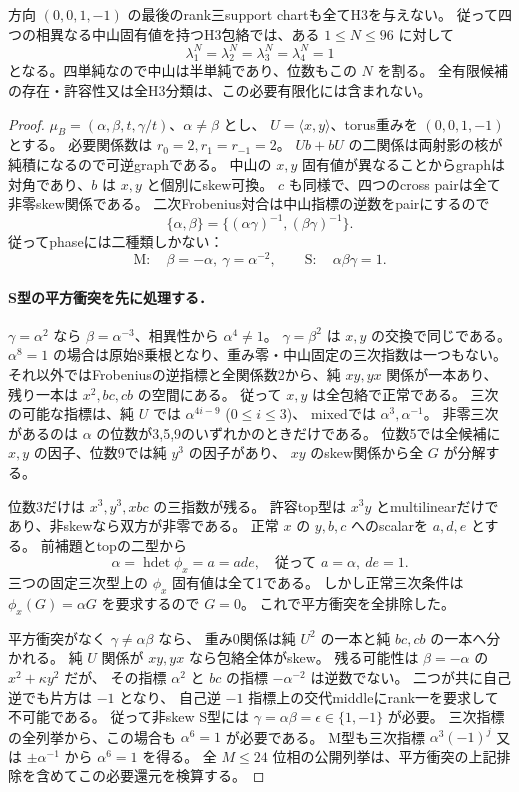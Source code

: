 \begin{theorem}[全rank三supportの排除]
\label{thm:cubic-all-four-simple-rank3-empty}
方向 $(0,0,1,-1)$ の最後のrank三support chartも全てH3を与えない。
従って四つの相異なる中山固有値を持つH3包絡では、ある $1\le N\le96$ に対して
\[
 \lambda_1^N=\lambda_2^N=\lambda_3^N=\lambda_4^N=1
\]
となる。四単純なので中山は半単純であり、位数もこの $N$ を割る。
全有限候補の存在・許容性又は全H3分類は、この必要有限化には含まれない。
\end{theorem}
\begin{proof}
$\mu_B=(\alpha,\beta,t,\gamma/t)$、$\alpha\ne\beta$ とし、
$U=\langle x,y\rangle$、torus重みを $(0,0,1,-1)$ とする。
必要関係数は $r_0=2,r_1=r_{-1}=2$。
$Ub+bU$ の二関係は両射影の核が純積になるので可逆graphである。
中山の $x,y$ 固有値が異なることからgraphは対角であり、$b$ は $x,y$ と個別にskew可換。
$c$ も同様で、四つのcross pairは全て非零skew関係である。
二次Frobenius対合は中山指標の逆数をpairにするので
\[
 \{\alpha,\beta\}=
 \{(\alpha\gamma)^{-1},(\beta\gamma)^{-1}\}.
\]
従ってphaseには二種類しかない：
\[
 \mathrm M:\quad \beta=-\alpha,\ \gamma=\alpha^{-2},
 \qquad
 \mathrm S:\quad \alpha\beta\gamma=1.
\]

\paragraph{S型の平方衝突を先に処理する．}
$\gamma=\alpha^2$ なら $\beta=\alpha^{-3}$、相異性から $\alpha^4\ne1$。
$\gamma=\beta^2$ は $x,y$ の交換で同じである。
$\alpha^8=1$ の場合は原始8乗根となり、重み零・中山固定の三次指数は一つもない。
それ以外ではFrobeniusの逆指標と全関係数2から、純 $xy,yx$ 関係が一本あり、
残り一本は $x^2,bc,cb$ の空間にある。
従って $x,y$ は全包絡で正常である。
三次の可能な指標は、純 $U$ では $\alpha^{4i-9}$ ($0\le i\le3$)、
mixedでは $\alpha^3,\alpha^{-1}$。
非零三次があるのは $\alpha$ の位数が3,5,9のいずれかのときだけである。
位数5では全候補に $x,y$ の因子、位数9では純 $y^3$ の因子があり、
$xy$ のskew関係から全 $G$ が分解する。

位数3だけは $x^3,y^3,xbc$ の三指数が残る。
許容top型は $x^3y$ とmultilinearだけであり、非skewなら双方が非零である。
正常 $x$ の $y,b,c$ へのscalarを $a,d,e$ とする。
前補題とtopの二型から
\[
 \alpha=\operatorname{hdet}\phi_x=a=ade,
 \quad\text{従って }a=\alpha,\ de=1.
\]
三つの固定三次型上の $\phi_x$ 固有値は全て1である。
しかし正常三次条件は $\phi_x(G)=\alpha G$ を要求するので $G=0$。
これで平方衝突を全排除した。

平方衝突がなく $\gamma\ne\alpha\beta$ なら、
重み0関係は純 $U^2$ の一本と純 $bc,cb$ の一本へ分かれる。
純 $U$ 関係が $xy,yx$ なら包絡全体がskew。
残る可能性は $\beta=-\alpha$ の $x^2+\kappa y^2$ だが、
その指標 $\alpha^2$ と $bc$ の指標 $-\alpha^{-2}$ は逆数でない。
二つが共に自己逆でも片方は $-1$ となり、
自己逆 $-1$ 指標上の交代middleにrank一を要求して不可能である。
従って非skew S型には $\gamma=\alpha\beta=\epsilon\in\{1,-1\}$ が必要。
三次指標の全列挙から、この場合も $\alpha^6=1$ が必要である。
M型も三次指標 $\alpha^3(-1)^j$ 又は $\pm\alpha^{-1}$ から $\alpha^6=1$ を得る。
全 $M\le24$ 位相の公開列挙は、平方衝突の上記排除を含めてこの必要還元を検算する。


\end{proof}
